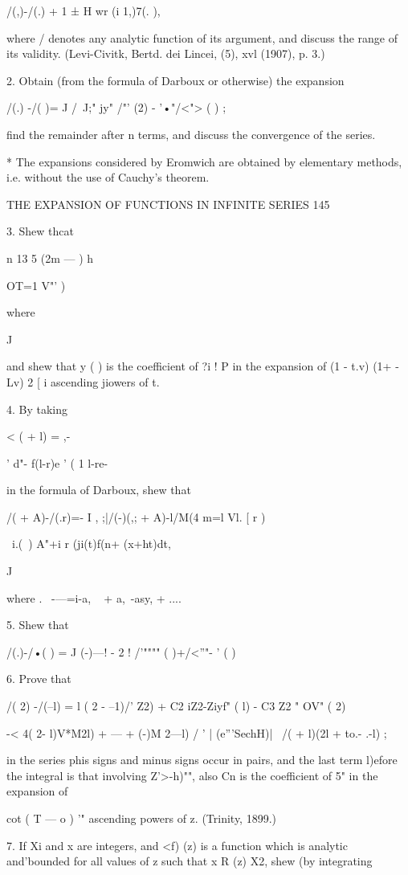 {{/(,)-/(.) + 1 ± H wr (i 1,)7(. ),

where / denotes any analytic function of its argument, and discuss the
range of its validity. (Levi-Civitk, Bertd. dei Lincei, (5), xvl
(1907), p. 3.)

2. Obtain (from the formula of Darboux or otherwise) the expansion

/(.) -/( )= J /~J;" jy" /"' (2) - '•"/<"> ( ) ;

find the remainder after n terms, and discuss the convergence of the
series.

* The expansions considered by Eromwich are obtained by elementary
methods, i.e. without the use of Cauchy's theorem.

THE EXPANSION OF FUNCTIONS IN INFINITE SERIES 145

3. Shew thcat

n 13 5 (2m — ) h

OT=1 V"' )

where

J

and shew that y ( ) is the coefficient of ?i ! P in the expansion of
(1 - t.v) (1+ - Lv) 2 [ i ascending jiowers of t.

4. By taking

< ( + l) = ,-

' d"- f(l-r)e ' ( 1 l-re-

in the formula of Darboux, shew that

/( + A)-/(.r)=- I , ;|/(-)(,; + A)-l/M(4 m=l Vl. [ r )

\ i.(\ ) A"+i r (ji(t)f(n+ (x+ht)dt,

J

where . \ -—=i-a, ~ + a,~-asy, + ....

5. Shew that

/(.)-/•( ) = J (-)—! - 2 ! /'"""" ( )+/<''"- ' ( )

6. Prove that

/( 2) -/(--l) = l ( 2 - --1)/' Z2) + C2 iZ2-Ziyf" ( l) - C3 Z2 " OV" (
2)

-< 4( 2- l)V*M2l) + --- + (-)M 2---l) / ' | (e'''SechH)| \ /( + l)(2l
+ to.- .-l) ;

in the series phis signs and minus signs occur in pairs, and the last
term l)efore the integral is that involving Z'>-h)"", also Cn is the
coefficient of 5" in the expansion of

cot ( T — o ) '" ascending powers of z. (Trinity, 1899.)

7. If Xi and x are integers, and <f) (z) is a function which is
analytic and'bounded for all values of z such that x R (z) X2, shew
(by integrating

}}
